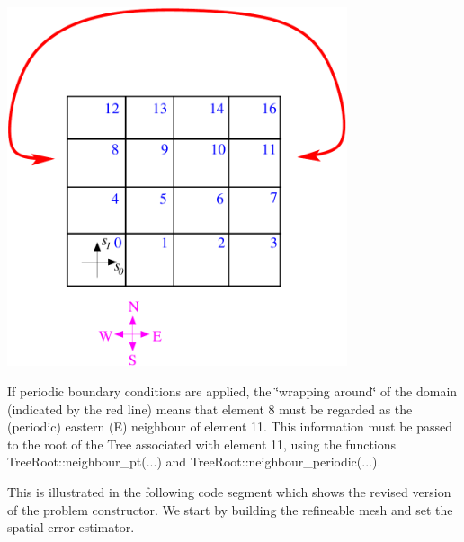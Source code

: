  
\begin{DoxyImage}
\includegraphics[width=0.75\textwidth]{wrapped_forest}
\end{DoxyImage}


If periodic boundary conditions are applied, the \char`\"{}wrapping around\char`\"{} of the domain (indicated by the red line) means that element 8 must be regarded as the (periodic) eastern (E) neighbour of element 11. This information must be passed to the root of the {\ttfamily Tree} associated with element 11, using the functions {\ttfamily Tree\+Root\+::neighbour\+\_\+pt}(...) and {\ttfamily Tree\+Root\+::neighbour\+\_\+periodic}(...).

This is illustrated in the following code segment which shows the revised version of the problem constructor. We start by building the refineable mesh and set the spatial error estimator.


